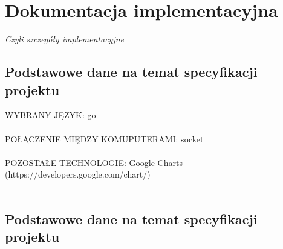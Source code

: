 \section{Dokumentacja implementacyjna}

\begin{center}
\textit{Czyli szczegóły implementacyjne}
\end{center}



\subsection{Podstawowe dane na temat specyfikacji projektu}
WYBRANY JĘZYK: go\\
\\
POŁĄCZENIE MIĘDZY KOMUPUTERAMI: socket\\
\\
POZOSTAŁE TECHNOLOGIE: Google Charts (https://developers.google.com/chart/)\\
\\

\subsection{Podstawowe dane na temat specyfikacji projektu}
